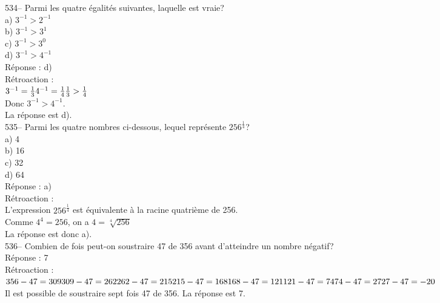 ﻿\documentclass[letterpaper, 12pt]{article}
\begin{document}
534-- Parmi les quatre \'egalit\'es suivantes, laquelle est vraie?\\
a) $3^{-1}>2^{-1}$\\
b) $3^{-1}>3^{1}$\\
c) $3^{-1}>3^{0}$\\
d) $3^{-1}>4^{-1}$\\

R\'eponse : d)\\

R\'etroaction : \\
$3^{-1}=\frac{1}{3}\\[2mm]
4^{-1}=\frac{1}{4}\\[2mm]
\frac{1}{3}>\frac{1}{4}$\\[2mm]
Donc $3^{-1}>4^{-1}$.\\[2mm]
La r\'eponse est d).\\

535-- Parmi les quatre nombres ci-dessous, lequel repr\'esente
$256^{\frac{1}{4}}$?\\
a) 4\\
b) 16\\
c) 32\\
d) 64\\

R\'eponse : a)\\

R\'etroaction : \\
L'expression $256^{\frac{1}{4}}$ est \'equivalente \`a la racine quatri\`eme
de 256.  \\
Comme $4^{4} = 256$, on a $4=\sqrt[4]{256}$ \\
La r\'eponse est donc a).\\

536-- Combien de fois peut-on soustraire 47 de 356 avant d'atteindre un
nombre n\'egatif?\\

R\'eponse : 7\\

R\'etroaction : \\
$356-47=309\\
309-47=262\\
262-47=215\\
215-47=168\\
168-47=121\\
121-47=74\\
74-47=27\\
27-47=-20$\\
Il est possible de soustraire sept fois 47 de 356.  La r\'eponse est 7.\\
\end{document}
